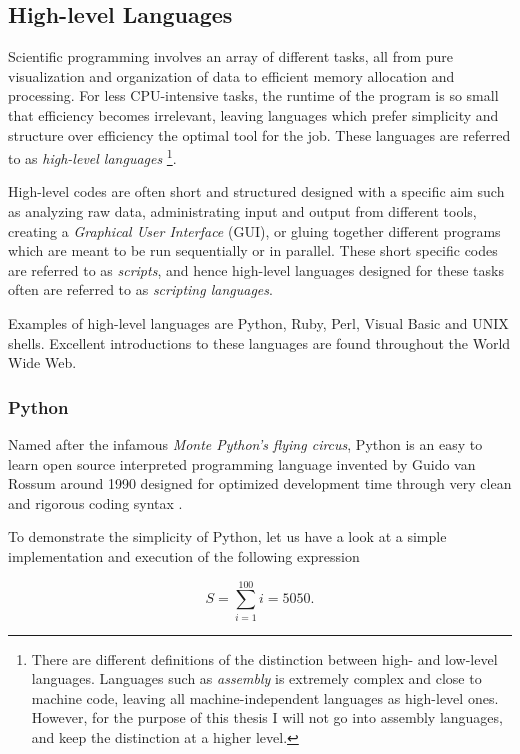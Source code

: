 \subsection{High-level Languages}

Scientific programming involves an array of different tasks, all from pure visualization and organization of data to efficient memory allocation and processing. For less CPU-intensive tasks, the runtime of the program is so small that efficiency becomes irrelevant, leaving languages which prefer simplicity and structure over efficiency the optimal tool for the job. These languages are referred to as \textit{high-level languages} \footnote{There are different definitions of the distinction between high- and low-level languages. Languages such as \textit{assembly} is extremely complex and close to machine code, leaving all machine-independent languages as high-level ones. However, for the purpose of this thesis I will not go into assembly languages, and keep the distinction at a higher level.}.

High-level codes are often short and structured designed with a specific aim such as analyzing raw data, administrating input and output from different tools, creating a \textit{Graphical User Interface} (GUI), or gluing together different programs which are meant to be run sequentially or in parallel. These short specific codes are referred to as \textit{scripts}, and hence high-level languages designed for these tasks often are referred to as \textit{scripting languages}\cite{inf3331, pythonBook}. 

Examples of high-level languages are Python, Ruby, Perl, Visual Basic and UNIX shells. Excellent introductions to these languages are found throughout the World Wide Web.

\subsubsection{Python}
\label{sec:Python}

Named after the infamous \textit{Monte Python's flying circus}, Python is an easy to learn open source interpreted programming language invented by Guido van Rossum around 1990 designed for optimized development time through very clean and rigorous coding syntax \cite{inf1100, pythonBook}. 

To demonstrate the simplicity of Python, let us have a look at a simple implementation and execution of the following expression

\[
 S = \sum_{i=1}^{100} i = 5050.  \label{eq:sum100}
\]

